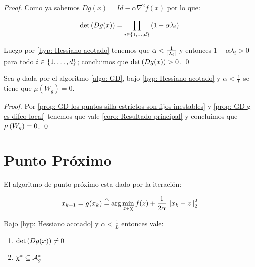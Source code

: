 \begin{proof}
	Como ya sabemos $Dg(x) = Id - \alpha \nabla^2 f (x)$ por lo que:
	
	\begin{equation*}
		\det \left(Dg(x)\right) = \prod\limits_{i \in \left\lbrace1, \dots, d\right\rbrace}{\left(1 - \alpha \lambda_i\right)}
	\end{equation*}
	
	Luego por \ref{hyp: Hessiano acotado} tenemos que $\alpha < \frac{1}{\left\lvert\lambda_i\right\rvert}$ y entonces $1 - \alpha \lambda_i > 0$ para todo $i \in \left\lbrace1, \dots, d\right\rbrace$; concluimos que $\det \left(Dg(x)\right) > 0$. \qed
	
\end{proof}

\begin{corollary}
	\label{Dg converge a minimos}
	Sea $g$ dada por el algoritmo \ref{algo: GD}, bajo \ref{hyp: Hessiano acotado} y $\alpha < \frac{1}{L}$ se tiene que $\mu \left(W_g\right) = 0$.
\end{corollary}

\begin{proof}
	Por \ref{prop: GD los puntos silla estrictos son fijos inestables} y \ref{prop: GD g es difeo local} tenemos que vale \ref{coro: Resultado principal} y concluimos que $\mu \left(W_g\right) = 0$. \qed
\end{proof}

\section{Punto Pr\'oximo}

El algoritmo de punto pr\'oximo esta dado por la iteraci\'on:

\begin{equation}
\label{eq: Punto proximo}
x_{k+1} = g(x_k) \stackrel{\triangle}{=} \arg \min\limits_{z \in \upchi}{f(z) + \dfrac{1}{2\alpha}\left\lVert x_k - z\right\rVert_{2}^{2}}
\end{equation}

\begin{proposition}
	\label{prop: PP es difeo local y los puntos silla estrictos son fijos inestables}
	Bajo \ref{hyp: Hessiano acotado} y $\alpha < \frac{1}{L}$ entonces vale:
	
	\begin{enumerate}
		\item $\det \left(Dg(x)\right) \neq 0$
		\item $\upchi^* \subseteq \mathcal{A}_{g}^{*}$
	\end{enumerate}
	
\end{proposition}

